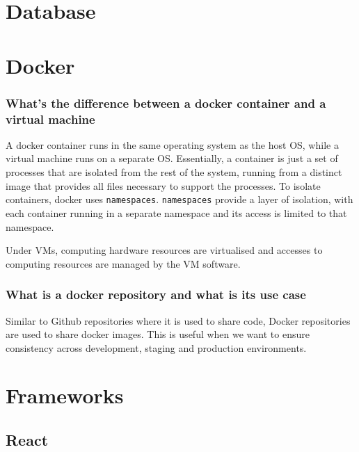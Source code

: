 \documentclass[12pt, a4paper]{article}
\newcommand{\code}[1]{\texttt{#1}}
\begin{document}
\pagebreak

\section*{Database}

\pagebreak

\section*{Docker}
\subsubsection*{What's the difference between a docker container and a virtual machine}
A docker container runs in the same operating system as the host OS, while a virtual machine runs on a separate OS.
Essentially, a container is just a set of processes that are isolated from the rest of the system, running from a distinct image that provides all files necessary to support the processes.
To isolate containers, docker uses \code{namespaces}. 
\code{namespaces} provide a layer of isolation, with each container running in a separate namespace and its access is limited to that namespace.

Under VMs, computing hardware resources are virtualised and accesses to computing resources are managed by the VM software.

\subsubsection*{What is a docker repository and what is its use case}
Similar to Github repositories where it is used to share code, Docker repositories are used to share docker images.
This is useful when we want to ensure consistency across development, staging and production environments.

\pagebreak

\section*{Frameworks}

\subsection*{React}
\end{document}
